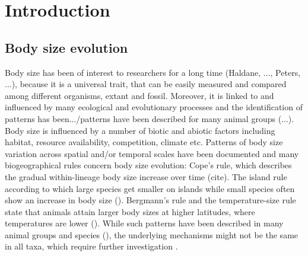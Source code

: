 \section{Introduction}
\subsection{Body size evolution}

Body size has been of interest to researchers for a long time (Haldane, ..., Peters, ...), because it is a universal trait, that can be easily measured and compared among different organisms, extant and fossil. Moreover, it is linked to and influenced by many ecological and evolutionary processes and the identification of patterns has been.../patterns have been described for many animal groups (...). Body size is influenced by a number of biotic and abiotic factors including habitat, resource availability, competition, climate etc.
Patterns of body size variation across spatial and/or temporal scales have been documented and many biogeographical rules concern body size evolution: Cope's rule, which describes the gradual within-lineage body size increase over time (cite). The island rule according to which large species get smaller on islands while small species often show an increase in body size (). Bergmann's rule and the temperature-size rule state that animals attain larger body sizes at higher latitudes, where temperatures are lower ().
While such patterns have been described in many animal groups and species (), the underlying mechanisms might not be the same in all taxa, which require further investigation \citep{Smith2009}.




